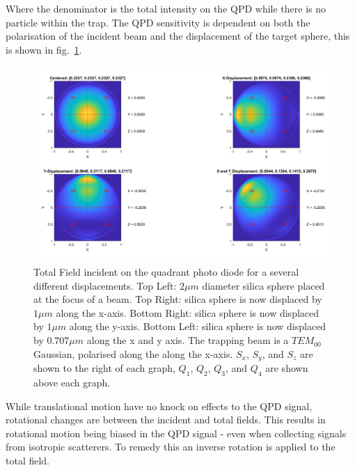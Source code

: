 Where the denominator is the total intensity on the QPD while there is 
no particle within the trap. The QPD sensitivity is dependent on both 
the polarisation of the incident beam and the displacement of the target 
sphere, this is shown in fig.~\ref{fig:totalfield}.
\begin{figure}[h!]
	\centering
	\includegraphics[width=\linewidth]{fixed_polarisation.png}
	\captionsetup{margin=0.5cm}
	\caption{Total Field incident on the quadrant photo diode for a several
		different displacements. Top Left: $2\mu m $ diameter silica sphere
		placed at the focus of a  beam. Top Right: silica sphere is now
		displaced by $1 \mu m$ along the x-axis. Bottom Right: silica sphere 
		is now displaced by $1 \mu m$ along the y-axis. Bottom Left: silica 
		sphere is now displaced by $0.707 \mu m$ along the x and y axis. 
		The trapping beam is a $TEM_{00}$ Gaussian, polarised along the 
		along the x-axis. $S_x$, $S_y$, and $S_z$ are shown to the right of 
		each graph, $Q_1$, $Q_2$, $Q_3$, and $Q_4$ are shown above each graph.}
	\label{fig:totalfield}
\end{figure}

While translational motion have no knock on effects to the QPD signal, 
rotational changes are between the incident and total fields. This results
in rotational motion being biased in the QPD signal - even when collecting
signals from isotropic scatterers. To remedy this an inverse rotation is
applied to the total field. 


